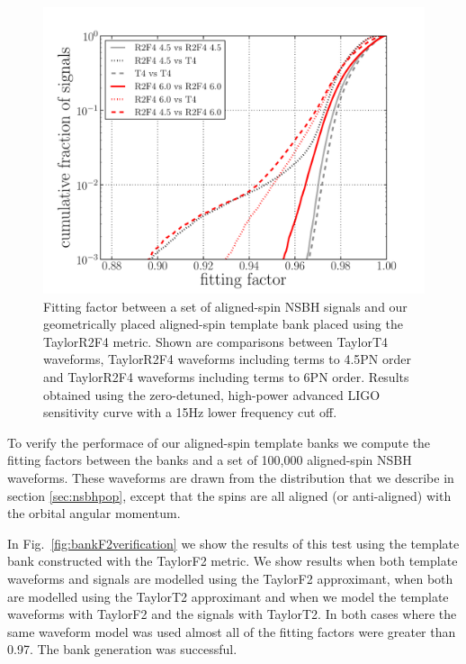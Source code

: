 \begin{figure}
\begin{center}
\includegraphics[width=1.0\textwidth]
{papers/nsbh_effectualness/figure4.pdf}
\end{center}
\caption{\label{fig:bankF4verification}
Fitting factor between a set of aligned-spin \ac{NSBH} signals and our
geometrically placed aligned-spin template bank placed using the TaylorR2F4
metric. Shown are comparisons between
TaylorT4 waveforms, TaylorR2F4 waveforms
including terms to 4.5PN order and TaylorR2F4 waveforms including terms to 6PN
order. Results obtained
using the zero-detuned, high-power advanced LIGO sensitivity curve with a 15Hz
lower frequency cut off.
}
\end{figure}

To verify the performace of our aligned-spin template banks we compute the
fitting factors between the banks and a set of 100,000 aligned-spin \ac{NSBH}
waveforms. These waveforms are drawn from the
distribution that we describe in section \ref{sec:nsbhpop}, except that the
spins are all aligned (or anti-aligned) with the orbital angular momentum.

In Fig.~\ref{fig:bankF2verification} we show the results of this test using
the template bank constructed with the TaylorF2 metric. We show results when
both template waveforms and signals are modelled using the TaylorF2
approximant, when both are modelled using the TaylorT2 approximant and when we
model the template waveforms with TaylorF2 and the signals with TaylorT2.
In both cases where the same waveform model was used almost all of the fitting
factors were greater than 0.97. The bank generation was successful.

